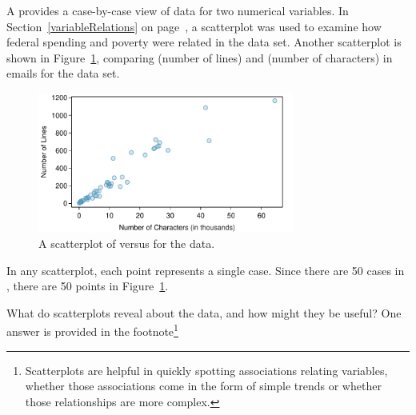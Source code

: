 A  provides a case-by-case view of data for two numerical variables. In Section~\ref{variableRelations} on page~\pageref{fed_spendVsPoverty}, a scatterplot was used to examine how federal spending and poverty were related in the  data set. Another scatterplot is shown in Figure~\ref{email50LinesCharacters}, comparing  (number of lines) and  (number of characters) in emails for the  data set.
\begin{figure}[h]
   \centering
   \includegraphics[width=0.75\textwidth]{01/figures/email50LinesCharacters/email50LinesCharacters} %
   \caption{A scatterplot of  versus  for the  data.}
   \label{email50LinesCharacters} %
\end{figure}

In any scatterplot, each point represents a single case. Since there are 50 cases in , there are 50 points in Figure~\ref{email50LinesCharacters}.

\begin{exercise}
What do scatterplots reveal about the data, and how might they be useful? One answer is provided in the footnote\footnote{Scatterplots are helpful in quickly spotting associations relating variables, whether those associations come in the form of simple trends or whether those relationships are more complex.} %
\end{exercise}

